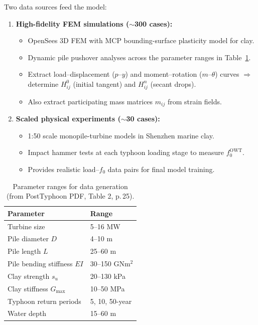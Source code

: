 \documentclass[11pt,a4paper]{article}
\begin{document}
Two data sources feed the model:

\begin{enumerate}[label=\textbf{\alph*)}]
  \item \textbf{High-fidelity FEM simulations ($\sim$300 cases):}
  \begin{itemize}[noitemsep]
    \item OpenSees 3D FEM with MCP bounding-surface plasticity model for clay.
    \item Dynamic pile pushover analyses across the parameter ranges in Table~\ref{tab:params}.
    \item Extract load--displacement ($p$--$y$) and moment--rotation ($m$--$\theta$) curves
          $\Rightarrow$ determine $H^0_{ij}$ (initial tangent) and $H^n_{ij}$ (secant drops).
    \item Also extract participating mass matrices $m_{ij}$ from strain fields.
  \end{itemize}

  \item \textbf{Scaled physical experiments ($\sim$30 cases):}
  \begin{itemize}[noitemsep]
    \item 1:50 scale monopile-turbine models in Shenzhen marine clay.
    \item Impact hammer tests at each typhoon loading stage to measure $f_0^{\text{OWT}}$.
    \item Provides realistic load--$f_0$ data pairs for final model training.
  \end{itemize}
\end{enumerate}

\begin{table}[h]
\centering
\caption{Parameter ranges for data generation (from PostTyphoon PDF, Table 2, p.\,25).}
\label{tab:params}
\begin{tabular}{ll}
\toprule
\textbf{Parameter} & \textbf{Range} \\
\midrule
Turbine size & 5--16 MW \\
Pile diameter $D$ & 4--10 m \\
Pile length $L$ & 25--60 m \\
Pile bending stiffness $EI$ & 30--150 GNm$^2$ \\
Clay strength $s_u$ & 20--130 kPa \\
Clay stiffness $G_{\max}$ & 10--50 MPa \\
Typhoon return periods & 5, 10, 50-year \\
Water depth & 15--60 m \\
\bottomrule
\end{tabular}
\end{table}
\end{document}
